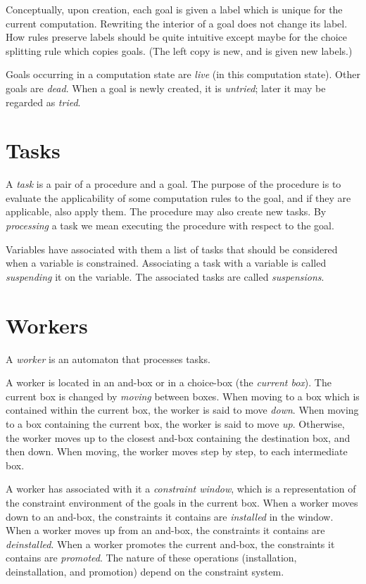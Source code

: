 Conceptually, upon creation, each goal is given a label which is
unique for the current computation.  Rewriting the interior of a goal
does not change its label.  How rules preserve labels should be quite
intuitive except maybe for the choice splitting rule which copies
goals. (The left copy is new, and is given new labels.)

Goals occurring in a computation state are {\em live} (in this
computation state).  Other goals are {\em dead}.  When a goal is newly
created, it is {\em untried}; later it may be regarded as {\em tried}.

\section{Tasks}

A {\em task} is a pair of a procedure and a goal.  The purpose of the
procedure is to evaluate the applicability of some computation rules
to the goal, and if they are applicable, also apply them.  The
procedure may also create new tasks.  By {\em processing} a task we
mean executing the procedure with respect to the goal.

Variables have associated with them a list of tasks that should be
considered when a variable is constrained.  Associating a task with a
variable is called {\em suspending} it on the variable.  The associated
tasks are called {\em suspensions}.

\section{Workers}

A {\em worker} is an automaton that processes tasks.

A worker is located in an and-box or in a choice-box (the {\em current
box}).  The current box is changed by {\em moving} between boxes.  When
moving to a box which is contained within the current box, the worker
is said to move {\em down}.  When moving to a box containing the
current box, the worker is said to move {\em up}.  Otherwise, the
worker moves up to the closest and-box containing the destination box,
and then down.  When moving, the worker moves step by step, to each
intermediate box.

A worker has associated with it a {\em constraint window}, which is a
representation of the constraint environment of the goals in the
current box.  When a worker moves down to an and-box, the constraints
it contains are {\em installed} in the window.  When a worker moves up
from an and-box, the constraints it contains are {\em deinstalled}.
When a worker promotes the current and-box, the constraints it
contains are {\em promoted}.  The nature of these operations
(installation, deinstallation, and promotion) depend on the constraint
system.

